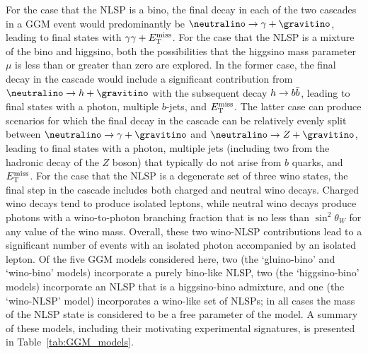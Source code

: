 For the case that the NLSP is a bino,
the final decay in each of the two cascades in a GGM event would predominantly be
$\neutralino\to\gamma+\gravitino$, leading
to final states with $\gamma\gamma+E_{\mathrm{T}}^{\mathrm{miss}}$.
For the case that the NLSP is a mixture of the bino
and higgsino, both the possibilities that the higgsino mass
parameter $\mu$ is less than or greater than zero are explored.
In the former case, the final decay in the cascade would include
a significant contribution from $\neutralino\to h + \gravitino$
with the subsequent decay $h \rightarrow b\bar{b}$, leading to final
states with a photon, multiple $b$-jets, and $E_{\mathrm{T}}^{\mathrm{miss}}$.
The latter case can produce scenarios for which the
final decay in the cascade can be relatively evenly split
between $\neutralino\to\gamma+\gravitino$ and
$\neutralino\to Z + \gravitino$, leading to final states with
a photon, multiple jets (including two from the hadronic decay of the $Z$ boson)
that typically do not arise from $b$ quarks,
and $E_{\mathrm{T}}^{\mathrm{miss}}$.
For the case that the NLSP is a degenerate set of three wino states,
the final step in the cascade includes both charged and neutral wino decays.
Charged wino decays tend to produce isolated
leptons, while neutral wino decays produce photons with a wino-to-photon
branching fraction that is no less than $\sin^2 \theta_W$ for any value of
the wino mass. Overall, these two wino-NLSP contributions lead to a significant
number of events with an isolated photon accompanied by an isolated lepton.
Of the five %
GGM models considered here, two (the `gluino-bino' and `wino-bino' models) %
incorporate a purely bino-like NLSP, two (the `higgsino-bino' models)    %
incorporate an NLSP that is a higgsino-bino admixture, and one (the `wino-NLSP' model)
incorporates a wino-like set of NLSPs; in all cases
the mass of the NLSP state is considered to be a free parameter
of the model.
A summary of these models,
including their motivating experimental signatures, is presented in Table~\ref{tab:GGM_models}.

